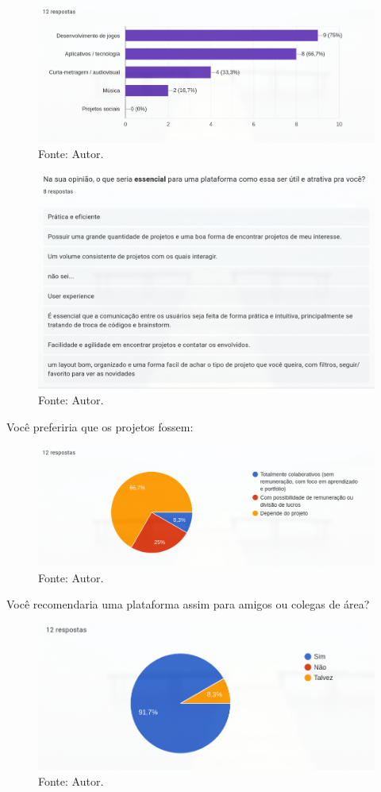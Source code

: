\begin{figure}[H]
    \centering
    \includegraphics[width=0.8\linewidth]{images/graph_7.png}
    \caption{Fonte: Autor.}
    \label{fig:g7}
\end{figure}

\begin{figure}[H]
    \centering
    \includegraphics[width=0.8\linewidth]{images/graph_8.png}
    \caption{Fonte: Autor.}
    \label{fig:g8}
\end{figure}

{\Large
Você preferiria que os projetos fossem:
}

\begin{figure}[H]
    \centering
    \includegraphics[width=0.8\linewidth]{images/graph_9.png}
    \caption{Fonte: Autor.}
    \label{fig:g9}
\end{figure}

{\Large
Você recomendaria uma plataforma assim para amigos ou colegas de área?
}

\begin{figure}[H]
    \centering
    \includegraphics[width=0.8\linewidth]{images/graph_10.png}
    \caption{Fonte: Autor.}
    \label{fig:g10}
\end{figure}

